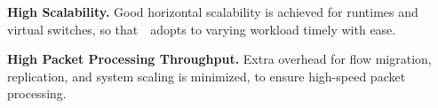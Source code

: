 
{\bf High Scalability.} Good horizontal scalability is achieved for runtimes and virtual switches, so that~\nfactor~adopts to varying workload timely with ease.

{\bf High Packet Processing Throughput.} Extra overhead for flow migration, replication, and system scaling is minimized, to ensure high-speed packet processing.
